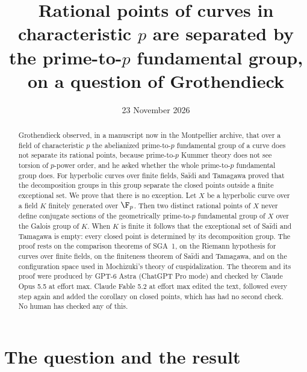 \title[Prime-to-$p$ sections separate rational points]{Rational points of curves in characteristic $p$ are separated by the prime-to-$p$ fundamental group, on a question of Grothendieck}
\author{}
\date{23 November 2026}



\begin{abstract}
Grothendieck observed, in a manuscript now in the Montpellier archive, that over a field of characteristic $p$ the abelianized prime-to-$p$ fundamental group of a curve does not separate its rational points, because prime-to-$p$ Kummer theory does not see torsion of $p$-power order, and he asked whether the whole prime-to-$p$ fundamental group does. For hyperbolic curves over finite fields, Sa\"idi and Tamagawa proved that the decomposition groups in this group separate the closed points outside a finite exceptional set. We prove that there is no exception. Let $X$ be a hyperbolic curve over a field $K$ finitely generated over $\F_p$. Then two distinct rational points of $X$ never define conjugate sections of the geometrically prime-to-$p$ fundamental group of $X$ over the Galois group of $K$. When $K$ is finite it follows that the exceptional set of Sa\"idi and Tamagawa is empty: every closed point is determined by its decomposition group. The proof rests on the comparison theorems of SGA~1, on the Riemann hypothesis for curves over finite fields, on the finiteness theorem of Sa\"idi and Tamagawa, and on the configuration space used in Mochizuki's theory of cuspidalization. The theorem and its proof were produced by GPT-6 Astra (ChatGPT Pro mode) and checked by Claude Opus 5.5 at effort max. Claude Fable 5.2 at effort max edited the text, followed every step again and added the corollary on closed points, which has had no second check. No human has checked any of this.
\end{abstract}

\maketitle

\section{The question and the result}

